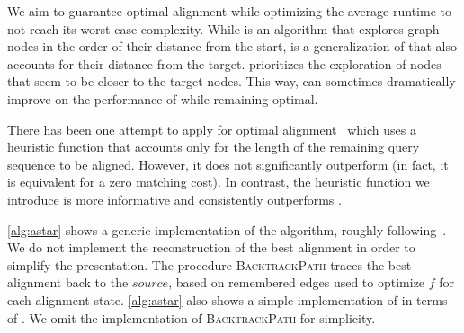 We aim to guarantee optimal alignment while optimizing the average runtime
to not reach its worst-case complexity. While \dijkstra is an algorithm that
explores graph nodes in the order of their distance from the start, \A is a
generalization of \dijkstra that also accounts for their distance from the
target. \A prioritizes the exploration of nodes that seem to be closer to the
target nodes. This way, \A can sometimes dramatically improve on the performance
of \dijkstra while remaining optimal.

There has been one attempt to apply \A for optimal
alignment~\cite{dox2018efficient} which uses a heuristic function that accounts
only for the length of the remaining query sequence to be aligned. However, it
does not significantly outperform \dijkstra (in fact, it is equivalent for
a zero matching cost).
%
In contrast, the heuristic function we introduce is more informative and
consistently outperforms \dijkstra.

\cref{alg:astar} shows a generic implementation of the \A algorithm,
roughly following~\cite{dechter_generalized_1985}.
We do not implement the reconstruction of the best alignment in order to simplify the presentation.
The procedure \mbox{\textsc{BacktrackPath}} traces the best alignment back to the $source$, based on remembered edges used to optimize $f$ for each alignment state.
%
\cref{alg:astar} also shows a simple implementation of \dijkstra in terms of \A.
We omit the implementation of \textsc{BacktrackPath} for simplicity.

